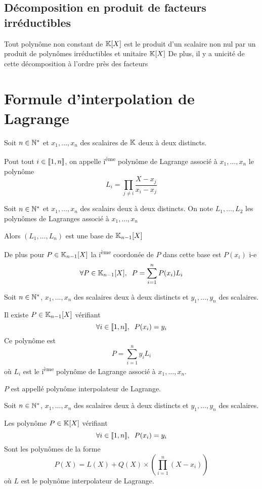 \subsection{Décomposition en produit de facteurs irréductibles}

\begin{thm}
Tout polynôme non constant de $\mathbb{K}[X]$ est le produit d'un scalaire
non nul par un produit de polynômes irréductibles et unitaire $\mathbb{K}[X]$
De plus, il y a unicité de cette décomposition à l'ordre près des
facteurs
\end{thm}

\section{Formule d'interpolation de Lagrange}

\begin{dfn}
Soit $n \in \mathbb{N}^*$ et $x_1, \ldots, x_n$ des scalaires de $\mathbb{K}$ deux à deux
distincts.

Pout tout $i \in \llbracket 1, n \rrbracket$, on appelle i\textsuperscript{éme}
polynôme de Lagrange associé à $x_1, \ldots, x_n$ le polynôme
\[
    L_i = \prod_{j \neq i} \frac{X - x_j}{x_i - x_j}
\]
\end{dfn}

\begin{prp}
Soit $n \in \mathbb{N}^*$ et $x_1, \ldots, x_n$ des scalairs deux à deux
distincts.
On note $L_1, \ldots, L_2$ les polynômes de Lagranges associé à
$x_1, \ldots, x_n$ 

Alors $(L_1, \ldots, L_n)$ est une base de $\mathbb{K}_{n - 1}[X]$

De plus pour $P \in \mathbb{K}_{n - 1}[X]$ la i\textsuperscript{ème} coordonée
de $P$ dans cette base est $P(x_i)$ i-e
\[
    \forall P \in \mathbb{K}_{n - 1}[X], \;\; P = \sum^n_{i = 1} P(x_i) L_i
\]
\end{prp}

\begin{prp}
Soit $n \in \mathbb{N}^*$, $x_1, \ldots, x_n$ des scalaires deux à deux distincts
et $y_1, \ldots, y_n$ des scalaires.

Il existe $P \in \mathbb{K}_{n - 1}[X]$ vérifiant 
\[
    \forall i \in \llbracket 1, n \rrbracket, \;\; P(x_i) = y_i
\]
Ce polynôme est
\[
    P = \sum^n_{i = 1} y_i L_i
\]
où $L_i$ est le i\textsuperscript{ème} polynôme de Lagrange associé à
$x_1, \ldots, x_n$.

$P$ est appellé polynôme interpolateur de Lagrange.
\end{prp}

\begin{prp}
Soit $n \in \mathbb{N}^*$, $x_1, \ldots, x_n$ des scalaires deux à deux distincts
et $y_1, \ldots, y_n$ des scalaires.

Les polynôme $P \in \mathbb{K}[X]$ vérifiant
\[
    \forall i \in \llbracket 1, n \rrbracket, \;\; P(x_i) = y_i
\]
Sont les polynômes de la forme
\[
    P(X) = L(X) + Q(X) \times \left( \prod^n_{i = 1} (X - x_i)
    \right)
\]
où $L$ est le polynôme interpolateur de Lagrange.
\end{prp}



